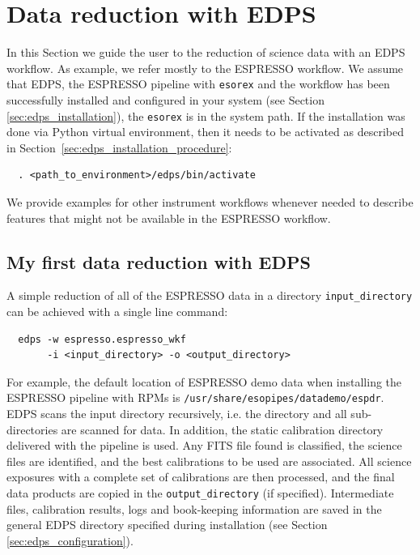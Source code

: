 
\section{Data reduction with EDPS}
\label{sec:edps_reduction}

In this Section we guide the user to the reduction of science data with an EDPS workflow. As example, we refer mostly to the ESPRESSO workflow. 
We assume that EDPS, the ESPRESSO pipeline with {\tt esorex} and the workflow has been successfully installed and configured in your system (see Section \ref{sec:edps_installation}), the {\tt esorex} is in the system path. If the installation was done via Python virtual environment, then it needs to be activated as described in Section~\ref{sec:edps_installation_procedure}:
\begin{verbatim}
  . <path_to_environment>/edps/bin/activate
\end{verbatim}

We provide examples for other instrument workflows whenever needed to describe features that might not be available in the ESPRESSO workflow.

\subsection{My first data reduction with EDPS}\label{sec:myfirst}

A simple reduction of all of the ESPRESSO data in a directory  {\tt input\_directory} can be achieved with a single line command:

 \begin{verbatim}
  edps -w espresso.espresso_wkf 
       -i <input_directory> -o <output_directory>
 \end{verbatim} 

For example, the default location of ESPRESSO demo data when installing the ESPRESSO pipeline with RPMs is {\tt /usr/share/esopipes/datademo/espdr}. EDPS scans the input directory recursively, i.e. the directory and all sub-directories are scanned for data. In addition, the static calibration directory delivered with the pipeline is used. Any FITS file found is classified, the science files are identified, and the best calibrations to be used are associated. All  science exposures with a complete set of calibrations are then processed, and the final data products are copied in the {\tt output\_directory} (if specified). Intermediate files, calibration results, logs and book-keeping information are saved in the general EDPS directory specified during installation (see Section \ref{sec:edps_configuration}).

